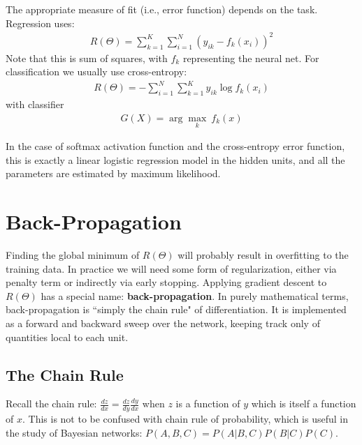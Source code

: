 \documentclass[a4paper]{article}
\begin{document}
The appropriate measure of fit (i.e., error function) depends on the task.  Regression uses:
\begin{align*}
R(\Theta) = \sum_{k=1}^K\sum_{i=1}^N(y_{ik}-f_k(x_i))^2
\end{align*}
Note that this is sum of squares, with $f_k$ representing the neural net. For classification we usually use cross-entropy:
\begin{align*}
R(\Theta) = -\sum_{i=1}^N\sum_{k=1}^Ky_{ik}\log f_k(x_i)
\end{align*}
with classifier
\begin{align*}
G(X) = \arg\max_k\ f_k(x)
\end{align*}

In the case of softmax activation function and the cross-entropy error function, this is exactly a linear logistic regression model in the hidden units, and all the parameters are estimated by maximum likelihood.

\section{Back-Propagation}
Finding the global minimum of $R(\Theta)$ will probably result in overfitting to the training data. In practice we will need some form of regularization, either via penalty term or indirectly via early stopping. Applying gradient descent to $R(\Theta)$ has a special name: \textbf{back-propagation}. In purely mathematical terms, back-propagation is ``simply the chain rule" of differentiation. It is implemented as a forward and backward sweep over the network, keeping track only of quantities local to each unit.
\subsection{The Chain Rule}
Recall the chain rule: $\frac{dz}{dx} = \frac{dz}{dy}\frac{dy}{dx}$ when $z$ is a function of $y$ which is itself a function of $x$. This is not to be confused with chain rule of probability, which is useful in the study of Bayesian networks: $P(A,B,C) = P(A | B,C) P(B| C) P(C)$.
\end{document}
